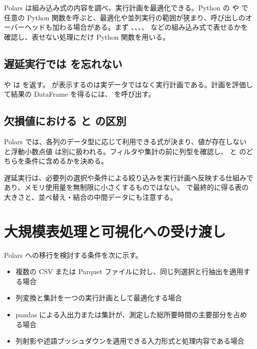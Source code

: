 Polars は組み込み式の内容を調べ、実行計画を最適化できる。Python の  や  で任意の Python 関数を呼ぶと、最適化や並列実行の範囲が狭まり、呼び出しのオーバーヘッドも加わる場合がある。まず 、、、、 などの組み込み式で表せるかを確認し、表せない処理にだけ Python 関数を用いる。

\subsection{遅延実行では  を忘れない}

 や  は  を返す。 が表示するのは実データではなく実行計画である。計画を評価して結果の DataFrame を得るには、 を呼び出す。

\subsection{欠損値における  と  の区別}

Polars では、各列のデータ型に応じて利用できる式が決まり、値が存在しない  と浮動小数点値  は別に扱われる。フィルタや集計の前に列型を確認し、 と  のどちらを条件に含めるかを決める。

遅延実行は、必要列の選択や条件による絞り込みを実行計画へ反映する仕組みであり、メモリ使用量を無制限に小さくするものではない。 で最終的に得る表の大きさと、並べ替え・結合の中間データにも注意する。

\section{大規模表処理と可視化への受け渡し}

Polars への移行を検討する条件を次に示す。

\begin{itemize}
\item 複数の CSV または Parquet ファイルに対し、同じ列選択と行抽出を適用する場合
\item 列変換と集計を一つの実行計画として最適化する場合
\item pandas による入出力または集計が、測定した総所要時間の主要部分を占める場合
\item 列射影や述語プッシュダウンを適用できる入力形式と処理内容である場合
\end{itemize}

